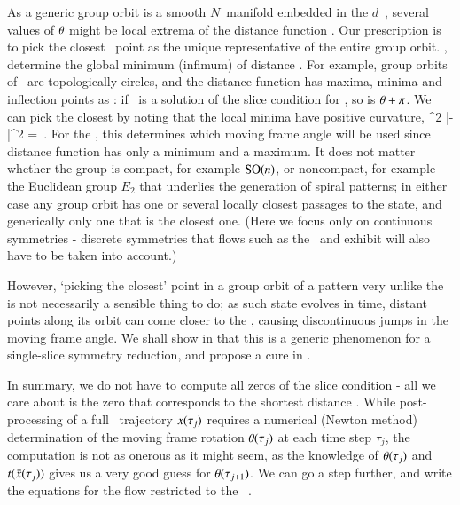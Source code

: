 \documentclass[preprint,12pt]{elsarticle} %
\begin{document}
As a generic group orbit is a smooth $N$\dmn\ manifold embedded in the
$d$\dmn\ \statesp, several values of ${\bf \theta}$ might be local extrema of
the distance function .
Our prescription is to pick the closest \reducedsp\ point as the unique
representative of the entire group orbit. \ie, determine the global
minimum (infimum) of distance .
For example, group orbits of
\ are topologically circles, and the distance function
has maxima, minima and inflection points as :
if \gSpace\ is a solution of the slice condition 
for \cLe,
so is ${\bf \theta}+\pi$. We can pick the closest by noting that
the local minima have positive curvature,
\beq
{}
     {\partial \gSpace^2}
        |\sspRed - \slicep|^2
    =
\,.
For the \cLe, this determines which moving frame angle will be used since
 distance function  has
only a minimum and a maximum.
It does not matter
whether the group is compact, for example $\textrm{SO}(n)$, or noncompact, for
example the Euclidean group $E_2$ that underlies the generation of spiral
patterns; in either case any group orbit has one or several
locally closest passages to the {\template} state, and generically only
one that is the closest one.
(Here we focus only on continuous symmetries - discrete symmetries that
flows such as the \KS\ and {\pCf} exhibit will also have to be taken into
account.)

However, `picking the closest' point in a group orbit of a pattern very unlike
the {\template} is not necessarily a sensible thing to do; as such state
evolves in time, distant points along its orbit can come closer to the
{\template}, causing discontinuous jumps in the moving frame angle. We
shall show in  that this is a generic phenomenon for a
single-slice symmetry reduction, and propose a cure in .

In summary, we do not have to compute all zeros of the slice condition
 - all we care about is the zero that
corresponds to the shortest distance .
While post-processing of a full \statesp\ trajectory $x(\tau_j)$
requires a numerical (Newton method) determination of the
moving frame rotation
${\bf \theta}(\tau_j)$ at each time step $\tau_j$, the computation is not
as onerous as it might seem, as the knowledge of ${\bf \theta}(\tau_j)$ and
$t(\bar{x}(\tau_j))$
gives us a very good guess for ${\bf \theta}(\tau_{j+1})$. We
can go a step further, and write the equations for the flow restricted to
the \reducedsp\ \pSRed.
\end{document}
